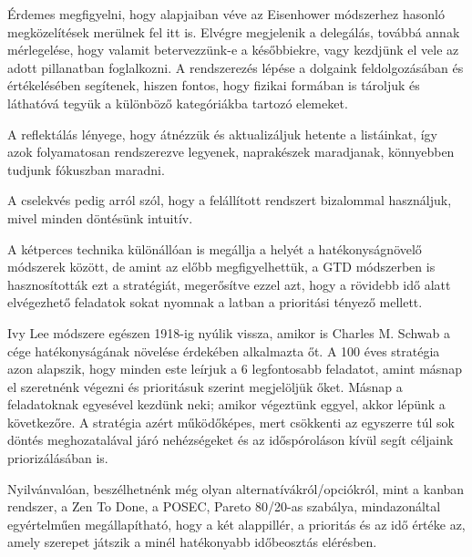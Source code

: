 Érdemes megfigyelni, hogy alapjaiban véve az Eisenhower módszerhez hasonló megközelítések merülnek fel itt is. Elvégre megjelenik a delegálás, továbbá annak mérlegelése, hogy valamit betervezzünk-e a későbbiekre, vagy kezdjünk el vele az adott pillanatban foglalkozni.
A rendszerezés lépése a dolgaink feldolgozásában és értékelésében segítenek, hiszen fontos, hogy fizikai formában is tároljuk és láthatóvá tegyük a különböző kategóriákba tartozó elemeket.

A reflektálás lényege, hogy átnézzük és aktualizáljuk hetente a listáinkat, így azok folyamatosan rendszerezve legyenek, naprakészek maradjanak, könnyebben tudjunk fókuszban maradni.

A cselekvés pedig arról szól, hogy a felállított rendszert bizalommal használjuk, mivel minden döntésünk intuitív.


A kétperces technika különállóan is megállja a helyét a hatékonyságnövelő módszerek között, de amint az előbb megfigyelhettük, a GTD módszerben is hasznosították ezt a stratégiát, megerősítve ezzel azt, hogy a rövidebb idő alatt elvégezhető feladatok sokat nyomnak a latban a prioritási tényező mellett.



Ivy Lee módszere egészen 1918-ig nyúlik vissza, amikor is Charles M. Schwab a cége hatékonyságának növelése érdekében alkalmazta őt. A 100 éves stratégia azon alapszik, hogy minden este leírjuk a 6 legfontosabb feladatot, amint másnap el szeretnénk végezni és prioritásuk szerint megjelöljük őket. Másnap a feladatoknak egyesével kezdünk neki; amikor végeztünk eggyel, akkor lépünk a következőre. A stratégia azért működőképes, mert csökkenti az egyszerre túl sok döntés meghozatalával járó nehézségeket és az időspóroláson kívül segít céljaink priorizálásában is.

Nyilvánvalóan, beszélhetnénk még olyan alternatívákról/opciókról, mint a kanban rendszer, a Zen To Done, a POSEC, Pareto 80/20-as szabálya, mindazonáltal egyértelműen megállapítható, hogy a két alappillér, a prioritás és az idő értéke az, amely szerepet játszik a minél hatékonyabb időbeosztás elérésben.



